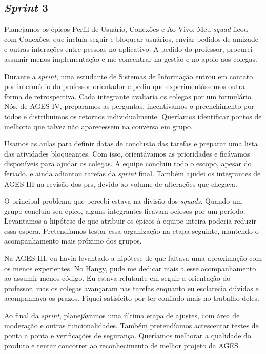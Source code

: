 \subsection{\textit{Sprint} 3}

Planejamos os épicos Perfil de Usuário, Conexões e Ao Vivo. Meu
\textit{squad} ficou com Conexões, que incluía seguir e bloquear usuários,
enviar pedidos de amizade e outras interações entre pessoas no aplicativo.
A pedido do professor, procurei assumir menos implementação e me concentrar
na gestão e no apoio aos colegas.

Durante a \textit{sprint}, uma estudante de Sistemas de Informação entrou em
contato por intermédio do professor orientador e pediu que experimentássemos
outra forma de retrospectiva. Cada integrante avaliaria os colegas por um
formulário. Nós, de AGES IV, preparamos as perguntas, incentivamos o
preenchimento por todos e distribuímos os retornos individualmente. Queríamos
identificar pontos de melhoria que talvez não aparecessem na conversa em
grupo.

Usamos as aulas para definir datas de conclusão das tarefas e preparar uma
lista das atividades bloqueantes. Com isso, orientávamos as prioridades e
ficávamos disponíveis para ajudar os colegas. A equipe concluiu todo o
escopo, apesar do feriado, e ainda adiantou tarefas da \textit{sprint} final.
Também ajudei os integrantes de AGES III na revisão dos \acp{pr}, devido ao
volume de alterações que chegava.

O principal problema que percebi estava na divisão dos \textit{squads}.
Quando um grupo concluía seu épico, alguns integrantes ficavam ociosos por
um período. Levantamos a hipótese de que atribuir os épicos à equipe inteira
poderia reduzir essa espera. Pretendíamos testar essa organização na etapa
seguinte, mantendo o acompanhamento mais próximo dos grupos.

Na AGES III, eu havia levantado a hipótese de que faltava uma aproximação
com os menos experientes. No Hangy, pude me dedicar mais a esse acompanhamento
ao assumir menos código. Eu estava relutante em seguir a orientação do
professor, mas os colegas avançaram nas tarefas enquanto eu esclarecia
dúvidas e acompanhava os prazos. Fiquei satisfeito por ter confiado mais no
trabalho deles.

Ao final da \textit{sprint}, planejávamos uma última etapa de ajustes, com
área de moderação e outras funcionalidades. Também pretendíamos acrescentar
testes de ponta a ponta e verificações de segurança. Queríamos melhorar a
qualidade do produto e tentar concorrer ao reconhecimento de melhor projeto
da AGES.
